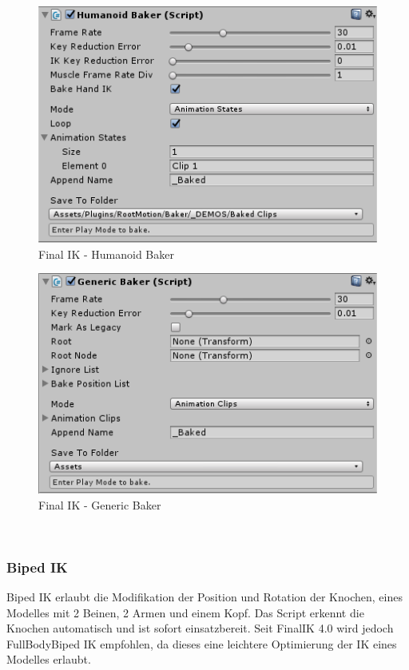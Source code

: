 \begin {figure}
    \centering
    \includegraphics[scale=1]{pics/finalik_baker_HumanoidBakerComponent}
    \caption{Final IK - Humanoid Baker}
    \label{fig:finalIK_humanoid_baker}
\end {figure}
\begin {figure}
    \centering
    \includegraphics[scale=1]{pics/finalik_baker_GenericBakerComponent}
    \caption{Final IK - Generic Baker}
    \label{fig:finalIK_generic_baker}
\end {figure}
~\cite{FinalIK_Baker_2021}

\subsubsection{Biped IK}
Biped IK erlaubt die Modifikation der Position und Rotation der Knochen, eines Modelles mit 2 Beinen, 2 Armen und einem Kopf.
Das Script erkennt die Knochen automatisch und ist sofort einsatzbereit.
Seit FinalIK 4.0 wird jedoch FullBodyBiped IK empfohlen, da dieses eine leichtere Optimierung der IK eines Modelles erlaubt.

